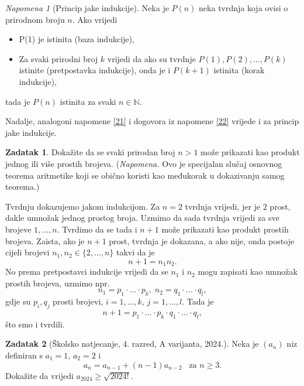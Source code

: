 \documentclass{book}
\renewenvironment{proof}{%
    \vspace{-\parskip}\begin{oldproof}%
    }{%
    \end{oldproof}%
}
\theoremstyle{definition}
\theoremstyle{definition}
\newtheorem{exercise}{Zadatak}
\theoremstyle{remark}
\newtheorem{remark}{Napomena}
\begin{document}
\begin{remark}[Princip jake indukcije]
Neka je $P(n)$ neka tvrdnja koja ovisi o prirodnom broju $n$. Ako vrijedi
\begin{itemize}
\item P(1) je istinita (baza indukcije),
\item Za svaki prirodni broj $k$ vrijedi da ako su tvrdnje $P(1), P(2), \dots, P(k)$ istinite (pretpostavka indukcije), onda je i $P(k+1)$ istinita (korak indukcije),
\end{itemize}
tada je $P(n)$ istinita za svaki $n\in \mathbb{N}$.
\end{remark}

Nadalje, analogoni napomene \ref{21} i dogovora iz napomene \ref{22} vrijede i za princip jake indukcije.

\begin{exercise}
\label{19}
Dokažite da se svaki prirodan broj $n>1$ može prikazati kao produkt jednog ili više prostih brojeva. (\textit{Napomena.} Ovo je specijalan slučaj osnovnog teorema aritmetike koji se obično koristi kao međukorak u dokazivanju samog teorema.)
\end{exercise}
\begin{proof}[Rješenje]
Tvrdnju dokazujemo jakom indukcijom. Za $n=2$ tvrdnja vrijedi, jer je $2$ prost, dakle umnožak jednog prostog broja. Uzmimo da sada tvrdnja vrijedi za sve brojeve $1, \dots, n$. Tvrdimo da se tada i $n+1$ može prikazati kao produkt prostih brojeva. Zaista, ako je $n+1$ prost, tvrdnja je dokazana, a ako nije, onda postoje cijeli brojevi $n_1, n_2\in \{2, \dots, n\}$ takvi da je $$n+1=n_1n_2.$$ No prema pretpostavci indukcije vrijedi da se $n_1$ i $n_2$ mogu zapisati kao umnožak prostih brojeva, uzmimo npr. 
$$n_1=p_1\cdot ...\cdot p_k,\; n_2=q_1\cdot... \cdot q_l,$$ gdje su $p_i, q_j$ prosti brojevi, $i=1,..., k$, $j=1,\dots, l$. Tada je $$n+1=p_1\cdot ...\cdot p_k\cdot q_1\cdot... \cdot q_l,$$ što smo i tvrdili.
\end{proof}
\begin{exercise}[Školsko natjecanje, 4. razred, A varijanta, 2024.]
Neka je $(a_n)$ niz definiran s $a_1=1$, $a_2=2$ i
$$a_n=a_{n-1}+(n-1)a_{n-2}\;\;\;\text{za } n\geq 3.$$
Dokažite da vrijedi $a_{2024}\geq \sqrt{2024!}$.
\end{exercise}
\end{document}
